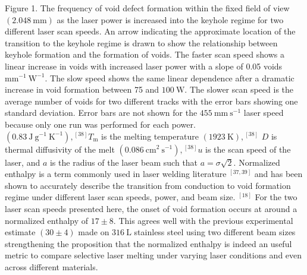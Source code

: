 \documentclass[10pt]{article}
\begin{document}
Figure 1. The frequency of void defect formation within the fixed field of view $(2.048 \mathrm{~mm})$ as the laser power is increased into the keyhole regime for two different laser scan speeds. An arrow indicating the approximate location of the transition to the keyhole regime is drawn to show the relationship between keyhole formation and the formation of voids. The faster scan speed shows a linear increase in voids with increased laser power with a slope of 0.05 voids $\mathrm{mm}^{-1} \mathrm{~W}^{-1}$. The slow speed shows the same linear dependence after a dramatic increase in void formation between 75 and $100 \mathrm{~W}$. The slower scan speed is the average number of voids for two different tracks with the error bars showing one standard deviation. Error bars are not shown for the $455 \mathrm{~mm} \mathrm{~s}^{-1}$ laser speed because only one run was performed for each power.\\
$\left(0.83 \mathrm{~J} \mathrm{~g}^{-1} \mathrm{~K}^{-1}\right),{ }^{[38]} T_{\mathrm{m}}$ is the melting temperature $(1923 \mathrm{~K}),{ }^{[38]}$ $D$ is thermal diffusivity of the melt $\left(0.086 \mathrm{~cm}^{2} \mathrm{~s}^{-1}\right),{ }^{[38]} u$ is the scan speed of the laser, and $a$ is the radius of the laser beam such that $a=\sigma \sqrt{2}$. Normalized enthalpy is a term commonly used in laser welding literature ${ }^{[37,39]}$ and has been shown to accurately describe the transition from conduction to void formation regime under different laser scan speeds, power, and beam size. ${ }^{[18]}$ For the two laser scan speeds presented here, the onset of void formation occurs at around a normalized enthalpy of $17 \pm 8$. This agrees well with the previous experimental estimate $(30 \pm 4)$ made on $316 \mathrm{~L}$ stainless steel using two different beam sizes strengthening the proposition that the normalized enthalpy is indeed an useful metric to compare selective laser melting under varying laser conditions and even across different materials.
\end{document}
